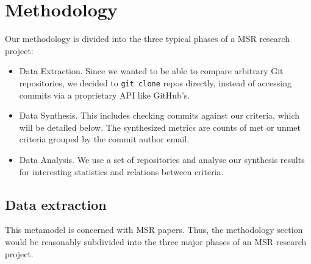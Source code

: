 \section{Methodology}

Our methodology is divided into the three typical phases of a MSR research project: 


\begin{itemize}
  \item Data Extraction. Since we wanted to be able to compare arbitrary Git repositories, we decided to \texttt{git clone} repos directly, instead of accessing commits via a proprietary API like GitHub's.
  \item Data Synthesis. This includes checking commits against our criteria, which will be detailed below. The synthesized metrics are counts of met or unmet criteria grouped by the commit author email.
  \item Data Analysis. We use a set of repositories and analyse our synthesis results for interesting statistics and relations between criteria.
\end{itemize}

\subsection{Data extraction}

This metamodel is concerned with MSR papers. Thus, the methodology
section would be reasonably subdivided into the three major phases of
an MSR research project.

